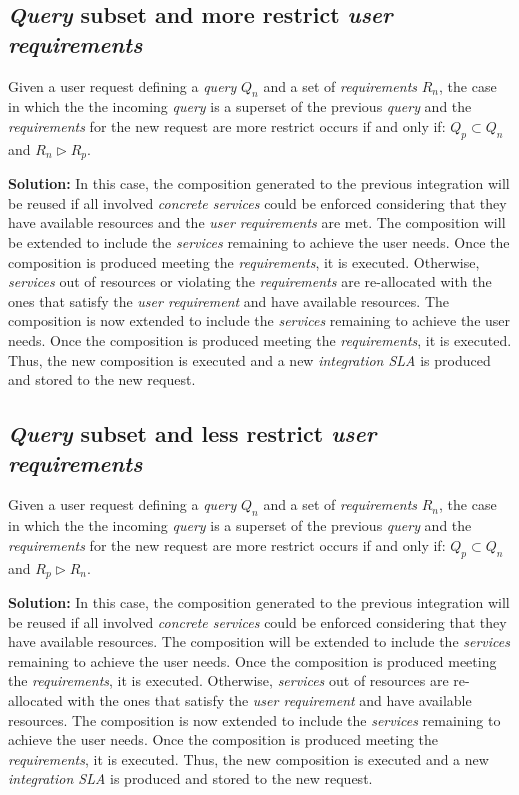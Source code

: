 \subsection{\textsl{Query} subset and more restrict \textsl{user requirements}}
Given a user request defining a \textsl{query} $Q_{n}$ and a set of \textsl{requirements} $R_{n}$, the case in which the the incoming \textsl{query} is a superset of the previous \textsl{query} and the \textsl{requirements} for the new request are more restrict occurs if and only if: $Q_{p} \subset Q_{n}$ and $R_{n} \triangleright R_{p}$.

\bigskip
\noindent \textbf{Solution:} In this case, the composition generated to the previous integration will be reused if all involved \textsl{concrete services} could be enforced considering that they have available resources and the \textsl{user requirements} are met. The composition will be extended to include the \textsl{services} remaining to achieve the user needs. Once the composition is produced meeting the \textsl{requirements}, it is executed. Otherwise, \textsl{services} out of resources or violating the \textsl{requirements} are re-allocated with the ones that satisfy the \textsl{user requirement} and have available resources. The composition is now extended to include the \textsl{services} remaining to achieve the user needs. Once the composition is produced meeting the \textsl{requirements}, it is executed. Thus, the new composition is executed and a new \textsl{integration SLA} is produced and stored to the new request.

\subsection{\textsl{Query} subset and less restrict \textsl{user requirements}}
Given a user request defining a \textsl{query} $Q_{n}$ and a set of \textsl{requirements} $R_{n}$, the case in which the the incoming \textsl{query} is a superset of the previous \textsl{query} and the \textsl{requirements} for the new request are more restrict occurs if and only if: $Q_{p} \subset Q_{n}$ and $R_{p} \triangleright R_{n}$.

\bigskip
\noindent \textbf{Solution:} In this case, the composition generated to the previous integration will be reused if all involved \textsl{concrete services} could be enforced considering that they have available resources. The composition will be extended to include the \textsl{services} remaining to achieve the user needs. Once the composition is produced meeting the \textsl{requirements}, it is executed. Otherwise, \textsl{services} out of resources are re-allocated with the ones that satisfy the \textsl{user requirement} and have available resources. The composition is now extended to include the \textsl{services} remaining to achieve the user needs. Once the composition is produced meeting the \textsl{requirements}, it is executed. Thus, the new composition is executed and a new \textsl{integration SLA} is produced and stored to the new request.